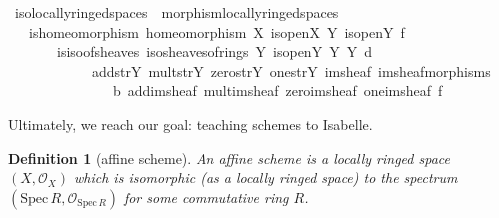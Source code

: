 \documentclass[12pt]{scrartcl}
\newtheorem{definition}[proposition]{Definition}
\def\spec{\text{Spec}\,R}
\begin{document}
\begin{isabelle}
\isamarkupfalse%
\ iso{\isacharunderscore}{\kern0pt}locally{\isacharunderscore}{\kern0pt}ringed{\isacharunderscore}{\kern0pt}spaces\ {\isacharequal}{\kern0pt}\ morphism{\isacharunderscore}{\kern0pt}locally{\isacharunderscore}{\kern0pt}ringed{\isacharunderscore}{\kern0pt}spaces\ {\isacharplus}{\kern0pt}\isanewline
\ \ \ is{\isacharunderscore}{\kern0pt}homeomorphism{\isacharcolon}{\kern0pt}\ {\isachardoublequoteopen}homeomorphism\ X\ is{\isacharunderscore}{\kern0pt}open\isactrlsub X\ Y\ is{\isacharunderscore}{\kern0pt}open\isactrlsub Y\ f{\isachardoublequoteclose}\ \isanewline
\ \ \ \ \ \ \ is{\isacharunderscore}{\kern0pt}iso{\isacharunderscore}{\kern0pt}of{\isacharunderscore}{\kern0pt}sheaves{\isacharcolon}{\kern0pt}\ {\isachardoublequoteopen}iso{\isacharunderscore}{\kern0pt}sheaves{\isacharunderscore}{\kern0pt}of{\isacharunderscore}{\kern0pt}rings\ Y\ is{\isacharunderscore}{\kern0pt}open\isactrlsub Y\ {\isasymO}\isactrlsub Y\ {\isasymrho}\isactrlsub Y\ d\ \isanewline
\ \ \ \ \ \ \ \ \ \ \ \ add{\isacharunderscore}{\kern0pt}str\isactrlsub Y\ mult{\isacharunderscore}{\kern0pt}str\isactrlsub Y\ zero{\isacharunderscore}{\kern0pt}str\isactrlsub Y\ one{\isacharunderscore}{\kern0pt}str\isactrlsub Y\ im{\isacharunderscore}{\kern0pt}sheaf\ im{\isacharunderscore}{\kern0pt}sheaf{\isacharunderscore}{\kern0pt}morphisms\isanewline
\ \ \ \ \ \ \ \ \ \ \ \ \ \ \ b\ add{\isacharunderscore}{\kern0pt}im{\isacharunderscore}{\kern0pt}sheaf\ mult{\isacharunderscore}{\kern0pt}im{\isacharunderscore}{\kern0pt}sheaf\ zero{\isacharunderscore}{\kern0pt}im{\isacharunderscore}{\kern0pt}sheaf\ one{\isacharunderscore}{\kern0pt}im{\isacharunderscore}{\kern0pt}sheaf\ {\isasymphi}\isactrlsub f{\isachardoublequoteclose}
\end{isabelle}

Ultimately, we reach our goal: teaching schemes to Isabelle.	

\begin{definition}[affine scheme]
	An affine scheme is a locally ringed space $(X, \mathscr{O}_X)$ which is isomorphic (as a locally ringed space) to the spectrum $(\text{Spec}\,R, \mathscr{O}_{\spec})$ for some commutative ring $R$. 
\end{definition}
\end{document}
